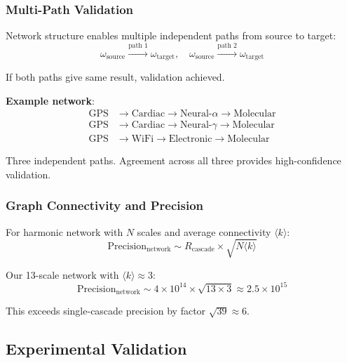 \documentclass[11pt,onecolumn]{article}
\begin{document}
\subsubsection{Multi-Path Validation}

Network structure enables multiple independent paths from source to target:
\begin{equation}
\omega_{\text{source}} \xrightarrow{\text{path } 1} \omega_{\text{target}}, \quad \omega_{\text{source}} \xrightarrow{\text{path } 2} \omega_{\text{target}}
\end{equation}

If both paths give same result, validation achieved.

\textbf{Example network}:
\begin{align}
\text{GPS} &\to \text{Cardiac} \to \text{Neural-}\alpha \to \text{Molecular} \\
\text{GPS} &\to \text{Cardiac} \to \text{Neural-}\gamma \to \text{Molecular} \\
\text{GPS} &\to \text{WiFi} \to \text{Electronic} \to \text{Molecular}
\end{align}

Three independent paths. Agreement across all three provides high-confidence validation.

\subsubsection{Graph Connectivity and Precision}

\begin{theorem}
For harmonic network with $N$ scales and average connectivity $\langle k \rangle$:
\begin{equation}
\text{Precision}_{\text{network}} \sim R_{\text{cascade}} \times \sqrt{N \langle k \rangle}
\end{equation}
\end{theorem}

Our 13-scale network with $\langle k \rangle \approx 3$:
\begin{equation}
\text{Precision}_{\text{network}} \sim 4 \times 10^{14} \times \sqrt{13 \times 3} \approx 2.5 \times 10^{15}
\end{equation}

This exceeds single-cascade precision by factor $\sqrt{39} \approx 6$.

\subsection{Experimental Validation}
\end{document}
